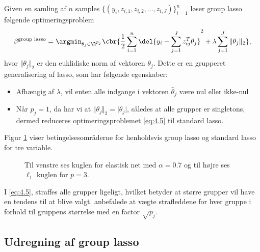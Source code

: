 Given en samling af $n$ samples \(\{(y_i, z_{i,1}, z_{i,2}, \ldots, z_{i,J})\}_{i=1}^n\) løser group lasso følgende optimeringsproblem
\begin{align}
\beta^{\text{group lasso}} = \argmin_{\theta_j \in \R^{p_j}} \cbr{\frac{1}{2} \sum_{i=1}^n \del{y_i - \sum_{j=1}^J z_{ij}^T \theta_j}^2 + \lambda \sum_{j=1}^J \Vert \theta_j \Vert_2},\label{eq:4.5}
\end{align}
hvor $\Vert \theta_j \Vert_2$ er den euklidiske norm af vektoren $\theta_j$.
Dette er en grupperet generalisering af lasso, som har følgende egenskaber:
\begin{itemize}
\item Afhængig af $\lambda$, vil enten alle indgange i vektoren $\hat{\theta}_j$ være nul eller ikke-nul
\item Når $p_j=1$, da har vi at $\Vert \theta_j \Vert_2 = \vert \theta_j \vert$, således at alle grupper er singletons, dermed reduceres optimeringsproblemet \eqref{eq:4.5} til standard lasso.
\end{itemize}
Figur \ref{fig:elastisk_net} viser betingelsesområderne for henholdsvis group lasso og standard lasso for tre variable.
%
\begin{figure}[H]
\centering
\caption{Til venstre ses kuglen for elastisk net med \(\alpha=0.7\) og til højre ses \(\ell_1\) kuglen for \(p=3\).}
\label{fig:elastisk_net}
\end{figure}
%
I \eqref{eq:4.5}, straffes alle grupper ligeligt, hvilket betyder at større grupper vil have en tendens til at blive valgt.
\citep{group_lasso} anbefalede at vægte strafleddene for hver gruppe i forhold til gruppens størrelse med en factor \(\sqrt{p_j}\).

\subsection{Udregning af group lasso}
